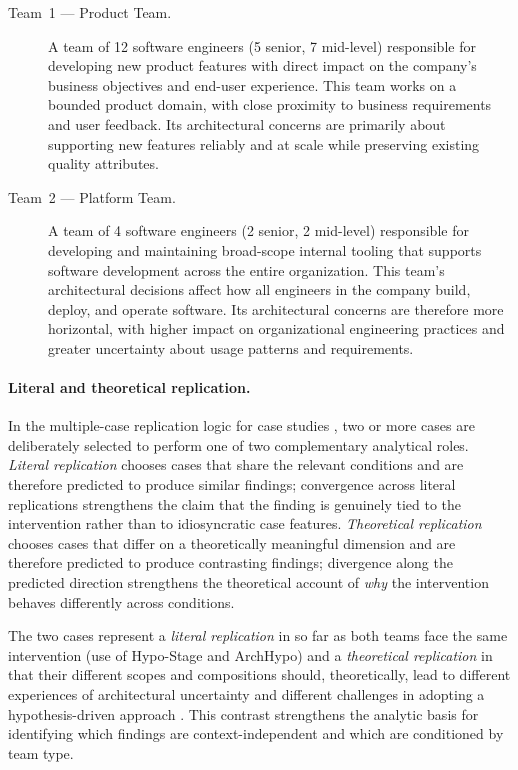 \begin{description}
  \item[Team~1 --- Product Team.] A team of 12 software engineers (5 senior,
    7 mid-level) responsible for developing new product features with direct
    impact on the company's business objectives and end-user experience. This team
    works on a bounded product domain, with close proximity to business requirements
    and user feedback. Its architectural concerns are primarily about supporting new
    features reliably and at scale while preserving existing quality attributes.

  \item[Team~2 --- Platform Team.] A team of 4 software engineers (2 senior,
    2 mid-level) responsible for developing and maintaining broad-scope internal
    tooling that supports software development across the entire organization. This
    team's architectural decisions affect how all engineers in the company build,
    deploy, and operate software. Its architectural concerns are therefore more
    horizontal, with higher impact on organizational engineering practices and
    greater uncertainty about usage patterns and requirements.
\end{description}

\paragraph{Literal and theoretical replication.} In the multiple-case replication logic for case studies \citep{yin2009}, two or more cases are deliberately selected to perform one of
two complementary analytical roles. \emph{Literal replication} chooses cases
that share the relevant conditions and are therefore predicted to produce
similar findings; convergence across literal replications strengthens the
claim that the finding is genuinely tied to the intervention rather than to
idiosyncratic case features. \emph{Theoretical replication} chooses cases
that differ on a theoretically meaningful dimension and are therefore
predicted to produce contrasting findings; divergence along the predicted
direction strengthens the theoretical account of \emph{why} the intervention
behaves differently across conditions.

The two cases represent a \emph{literal replication} in so far as both teams face
the same intervention (use of Hypo-Stage and ArchHypo) and a \emph{theoretical
replication} in that their different scopes and compositions should, theoretically,
lead to different experiences of architectural uncertainty and different challenges
in adopting a hypothesis-driven approach \citep{robson2016,yin2009}. This contrast
strengthens the analytic basis for identifying which findings are context-independent and which are conditioned by team type.

